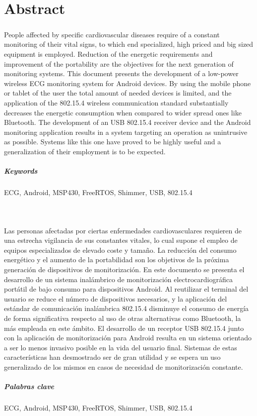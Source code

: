 \chapter{Abstract}
\label{cha:abstract}

	{\small 
	\paragraph{} People affected by specific cardiovascular diseases require of a constant monitoring of their vital signs, to which end specialized, high priced and big sized equipment is employed. Reduction of the energetic requirements and improvement of the portability are the objectives for the next generation of monitoring systems. This document presents the development of a low-power wireless ECG monitoring system for Android devices. By using the mobile phone or tablet of the user the total amount of needed devices is limited, and the application of the 802.15.4 wireless communication standard substantially decreases the energetic consumption when compared to wider spread ones like Bluetooth. The development of an USB 802.15.4 receiver device and the Android monitoring application results in a system targeting an operation as unintrusive as possible. Systems like this one have proved to be highly useful and a generalization of their employment is to be expected.
	\paragraph{Keywords}	
	ECG, Android, MSP430, FreeRTOS, Shimmer, USB, 802.15.4
	}\\
	
	{\small 
	\paragraph{} Las personas afectadas por ciertas enfermedades cardiovasculares requieren de una estrecha vigilancia de sus constantes vitales, lo cual supone el empleo de equipos especializados de elevado coste y tamaño. La reducción del consumo energético y el aumento de la portabilidad son los objetivos de la próxima generación de dispositivos de monitorización. En este documento se presenta el desarrollo de un sistema inalámbrico de monitorización electrocardiográfica portátil de bajo consumo para dispositivos Android. Al reutilizar el terminal del usuario se reduce el número de dispositivos necesarios, y la aplicación del estándar de comunicación inalámbrica 802.15.4 disminuye el consumo de energía de forma significativa respecto al uso de otras alternativas como Bluetooth, la más empleada en este ámbito. El desarrollo de un receptor USB 802.15.4 junto con la aplicación de monitorización para Android resulta en un sistema orientado a ser lo menos invasivo posible en la vida del usuario final. Sistemas de estas características han desmostrado ser de gran utilidad y se espera un uso generalizado de los mismos en casos de necesidad de monitorización constante.
	\paragraph{Palabras clave}
	ECG, Android, MSP430, FreeRTOS, Shimmer, USB, 802.15.4
	}



